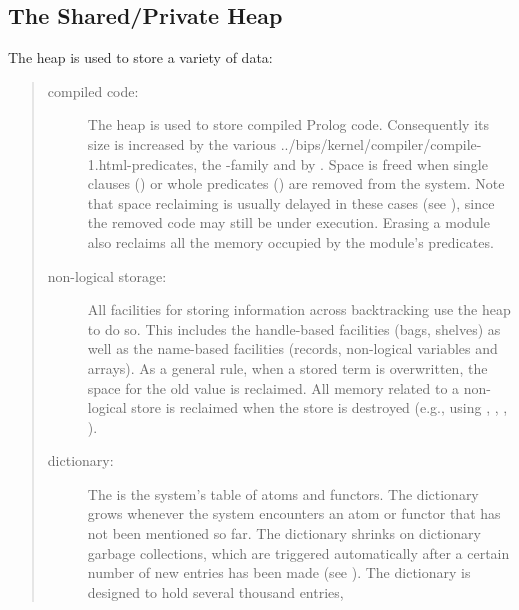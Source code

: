 \subsection{The Shared/Private Heap}
The heap is used to store a variety of data:
\begin{quote}
\begin{description}
\item [compiled code:]
The heap is used to store compiled Prolog code.
Consequently its size is increased by the various
%
{../bips/kernel/compiler/compile-1.html}-predicates,
the -family
and by .
Space is freed when single clauses
() or
whole predicates
() are
removed from the system.
Note that space reclaiming is usually delayed in these cases
(see ),
since the removed code may still be under execution.
Erasing a module also reclaims all the memory occupied by the module's
predicates.
\item [non-logical storage:]
All facilities for storing information across backtracking use the
heap to do so. This includes the handle-based facilities
(bags, shelves) as well as the name-based facilities (records, non-logical
variables and arrays).
As a general rule, when a stored term is overwritten, the space for
the old value is reclaimed. All memory related to a non-logical store is
reclaimed when the store is destroyed (e.g., using
,
,
,
).
\item [dictionary:]
The  is the system's table of atoms and functors.
The dictionary grows whenever the system encounters an atom or functor that
has not been mentioned so far.
The dictionary shrinks on dictionary garbage collections, which are triggered
automatically after a certain number of new entries has been made
(see ).
The dictionary is designed to hold several thousand entries,

\end{description}
\end{quote}
